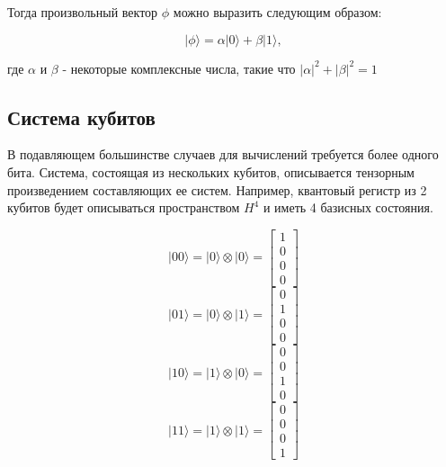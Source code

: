 \documentclass[14pt]{article}
\begin{document}
	Тогда произвольный вектор $\phi$ можно выразить следующим образом:
	
	\begin{equation}
	| \phi \rangle = \alpha |0 \rangle + \beta	|1 \rangle,
	\end{equation}
	
	где $\alpha$ и $\beta$ - некоторые комплексные числа, такие что $|\alpha|^2 + |\beta|^2 = 1$
	
	\newpage
	\subsection{Система кубитов}	
	
	В подавляющем большинстве случаев для вычислений требуется более одного бита. Система, состоящая из нескольких кубитов, описывается тензорным произведением составляющих ее систем. Например, квантовый регистр из 2 кубитов будет описываться пространством $H^4$ и иметь 4 базисных состояния.
	
	\begin{equation}
	|00 \rangle = |0 \rangle \otimes |0 \rangle = \begin{bmatrix} 1 \\ 0 \\ 0 \\ 0 \end{bmatrix}
	\end{equation}
	\begin{equation}
	|01 \rangle = |0 \rangle \otimes |1 \rangle = \begin{bmatrix} 0 \\ 1 \\ 0 \\ 0 \end{bmatrix}
	\end{equation}
	\begin{equation}
	|10 \rangle = |1 \rangle \otimes |0 \rangle = \begin{bmatrix} 0 \\ 0 \\ 1 \\ 0 \end{bmatrix}
	\end{equation}
	\begin{equation}
	|11 \rangle = |1 \rangle \otimes |1 \rangle = \begin{bmatrix} 0 \\ 0 \\ 0 \\ 1 \end{bmatrix}
	\end{equation}
	
\end{document}
